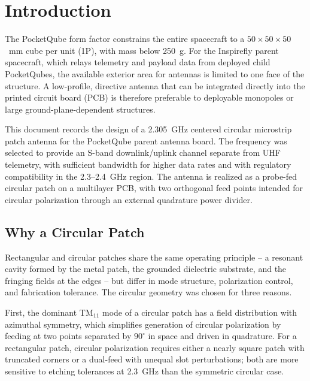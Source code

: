 %
%
%
%

\chapter{Introduction}

The PocketQube form factor constrains the entire spacecraft to a $50 \times 50 \times 50$~mm cube per unit (1P), with mass below 250~g. For the Inspirefly parent spacecraft, which relays telemetry and payload data from deployed child PocketQubes, the available exterior area for antennas is limited to one face of the structure. A low-profile, directive antenna that can be integrated directly into the printed circuit board (PCB) is therefore preferable to deployable monopoles or large ground-plane-dependent structures.

This document records the design of a 2.305~GHz centered circular microstrip patch antenna for the PocketQube parent antenna board. The frequency was selected to provide an S-band downlink/uplink channel separate from UHF telemetry, with sufficient bandwidth for higher data rates and with regulatory compatibility in the 2.3--2.4~GHz region. The antenna is realized as a probe-fed circular patch on a multilayer PCB, with two orthogonal feed points intended for circular polarization through an external quadrature power divider.

\section{Why a Circular Patch}

Rectangular and circular patches share the same operating principle -- a resonant cavity formed by the metal patch, the grounded dielectric substrate, and the fringing fields at the edges -- but differ in mode structure, polarization control, and fabrication tolerance. The circular geometry was chosen for three reasons.

First, the dominant $\mathrm{TM}_{11}$ mode of a circular patch has a field distribution with azimuthal symmetry, which simplifies generation of circular polarization by feeding at two points separated by $90^{\circ}$ in space and driven in quadrature. For a rectangular patch, circular polarization requires either a nearly square patch with truncated corners or a dual-feed with unequal slot perturbations; both are more sensitive to etching tolerances at 2.3~GHz than the symmetric circular case.

